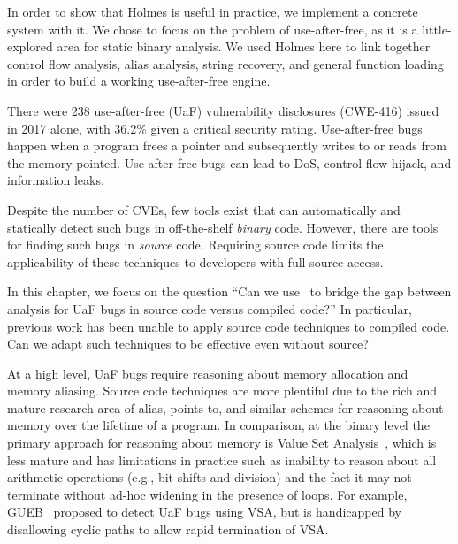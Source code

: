 In order to show that Holmes is useful in practice, we implement a concrete system with it.
We chose to focus on the problem of use-after-free, as it is a little-explored area for static binary analysis.
We used Holmes here to link together control flow analysis, alias analysis, string recovery, and general function loading in order to build a working use-after-free engine.

There were 238 use-after-free (UaF) vulnerability disclosures (CWE-416) issued in 2017 alone, with 36.2\% given a critical security
rating.
Use-after-free bugs happen when a program frees a pointer and subsequently writes to or reads from the memory pointed.
Use-after-free bugs can lead to DoS, control flow hijack, and information leaks.

Despite the number of CVEs, few tools exist that can automatically and statically detect such bugs in off-the-shelf \emph{binary} code.
However, there are tools for finding such bugs in \emph{source} code.
Requiring source code limits the applicability of these techniques to developers with full source access.

In this chapter, we focus on the question
``Can we use \sysname\ to bridge the gap between analysis for UaF bugs in source code versus compiled code?''
In particular, previous work has been unable to apply source code techniques to compiled code.
Can we adapt such techniques to be effective even without source?

At a high level, UaF bugs require reasoning about memory allocation and memory aliasing.
Source code techniques are more plentiful due to the rich and mature research area of alias, points-to, and similar schemes for reasoning about memory over the lifetime of a program.
In comparison, at the binary level the primary approach for reasoning about memory is Value Set Analysis~\cite{vsa}, which is less mature and has limitations in practice such as inability to reason about all arithmetic operations (e.g., bit-shifts and division) and the fact it may not terminate without ad-hoc widening in the presence of loops.
For example, GUEB~\cite{gueb} proposed to detect UaF bugs using VSA, but is handicapped by disallowing cyclic paths to allow rapid termination of VSA.

